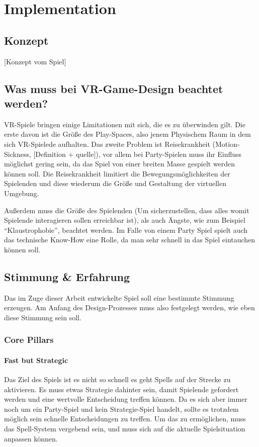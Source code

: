 \chapter{Implementation}

\section{Konzept}

[Konzept vom Spiel]

\section{Was muss bei VR-Game-Design beachtet werden?}

VR-Spiele bringen einige Limitationen mit sich, die es zu überwinden gilt. Die erste davon ist die Größe des Play-Spaces, also jenem Physischem Raum in dem sich VR-Spielede aufhalten. Das zweite Problem ist Reisekrankheit (Motion-Sickness, [Definition + quelle]), vor allem bei Party-Spielen muss ihr Einfluss möglichst gering sein, da das Spiel von einer breiten Masse gespielt werden können soll. Die Reisekrankheit limitiert die Bewegungsmöglichkeiten der Spielenden und diese wiederum die Größe und Gestaltung der virtuellen Umgebung.

Außerdem muss die Größe des Spielenden (Um sicherzustellen, dass alles womit Spielende interagieren sollen erreichbar ist), als auch Ängste, wie zum Beispiel "`Klaustrophobie"', beachtet werden. Im Falle von einem Party Spiel spielt auch das technische Know-How eine Rolle, da man sehr schnell in das Spiel eintauchen können soll.

\section{Stimmung \& Erfahrung}

Das im Zuge dieser Arbeit entwickelte Spiel soll eine bestimmte Stimmung erzeugen. Am Anfang des Design-Prozesses muss also festgelegt werden, wie eben diese Stimmung sein soll.

\subsection{Core Pillars}

\subsubsection{Fast but Strategic}
Das Ziel des Spiels ist es nicht so schnell es geht Spells auf der Strecke zu aktivieren. Es muss etwas Strategie dahinter sein, damit Spielende gefordert werden und eine wertvolle Entscheidung treffen können. Da es sich aber immer noch um ein Party-Spiel und kein Strategie-Spiel handelt, sollte es trotzdem möglich sein schnelle Entscheidungen zu treffen. Um das zu ermöglichen, muss das Spell-System vergebend sein, und muss sich auf die aktuelle Spielsituation anpassen können. 

